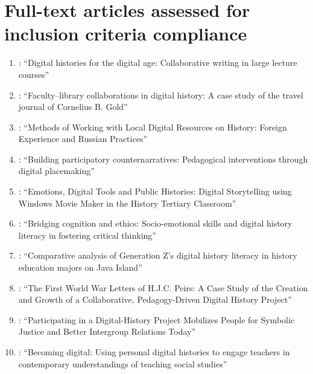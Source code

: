 \documentclass[
hf,
]{ceurart}
\begin{document}
\section{Full-text articles assessed for inclusion criteria compliance} \label{sec:appendix-b}

\begin{enumerate}
    \item \citet{Soh2013}: ``Digital histories for the digital age: Collaborative writing in large lecture courses''
    
    \item \citet{Davis2017}: ``Faculty–library collaborations in digital history: A case study of the travel journal of Cornelius B. Gold''
    
    \item \citet{Maslova2021}: ``Methods of Working with Local Digital Resources on History: Foreign Experience and Russian Practices''
    
    \item \citet{frith2021}: ``Building participatory counternarratives: Pedagogical interventions through digital placemaking''
    
    \item \citet{Coleborne2011}: ``Emotions, Digital Tools and Public Histories: Digital Storytelling using Windows Movie Maker in the History Tertiary Classroom''
    
    \item \citet{Nurhasanah2025}: ``Bridging cognition and ethics: Socio-emotional skills and digital history literacy in fostering critical thinking''
    
    \item \citet{Kumalasari2024}: ``Comparative analysis of Generation Z's digital history literacy in history education majors on Java Island''
    
    \item \citet{Lucadamo2024231}: ``The First World War Letters of H.J.C. Peirs: A Case Study of the Creation and Growth of a Collaborative, Pedagogy-Driven Digital History Project''
    
    \item \citet{Ditlmann2025}: ``Participating in a Digital-History Project Mobilizes People for Symbolic Justice and Better Intergroup Relations Today''
    
    \item \citet{Lee2014159}: ``Becoming digital: Using personal digital histories to engage teachers in contemporary understandings of teaching social studies''
    

\end{enumerate}
\end{document}

